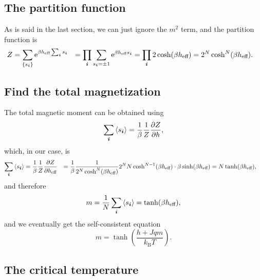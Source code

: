 \documentclass[hyperref, a4paper]{article}
\newcommand*{\ee}{\mathrm{e}}
\def\\{}%
\newcommand*{\kB}{k_{\text{B}}}
\begin{document}
\subsection{The partition function}

As is said in the last section, 
we can just ignore the $m^2$ term, 
and the partition function is 
\begin{equation}
    \begin{aligned}
        Z &= \sum_{\{s_{\vb*{i}}\}} \ee^{ \beta h_{\text{eff}} \sum_{\vb*{i}} s_{\vb*{i}}} \\
        &= \prod_{\vb*{i}} \sum_{s_{\vb*{i}} = \pm 1} 
        \ee^{\beta h_{\text{eff}} s_{\vb*{i}}} = \prod_{\vb*{i}} 2 \cosh (\beta h_{\text{eff}}) \\
        &= 2^N \cosh^N (\beta h_{\text{eff}}). 
    \end{aligned} 
\end{equation}

\subsection{Find the total magnetization}

The total magnetic moment can be obtained using 
\begin{equation}
    \sum_{\vb*{i}} \expval{s_{\vb*{i}}} = \frac{1}{\beta} \frac{1}{Z} \pdv{Z}{h} , 
\end{equation}
which, in our case, is 
\[
    \begin{aligned}
        \sum_{\vb*{i}} \expval{s_{\vb*{i}}} &= \frac{1}{\beta} \frac{1}{Z} \pdv{Z}{h_{\text{eff}}} \\
        &= \frac{1}{\beta} \frac{1}{2^N \cosh^N (\beta h_{\text{eff}})} 
        2^N N \cosh^{N-1} (\beta h_{\text{eff}}) \cdot \beta \sinh(\beta h_{\text{eff}}) \\
        &= N \tanh (\beta h_{\text{eff}}), 
    \end{aligned}
\]
and therefore 
\[
    m = \frac{1}{N} \sum_{\vb*{i}} \expval{s_{\vb*{i}}}
    = \tanh(\beta h_{\text{eff}}),
\]
and we eventually get the self-consistent equation 
\begin{equation}
    m = \tanh(\frac{h + Jq m}{\kB T}).
    \label{eq:ising.scf}
\end{equation}

\subsection{The critical temperature}
\end{document}
